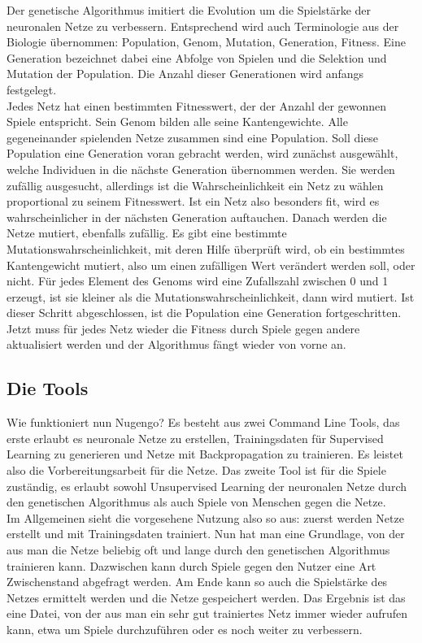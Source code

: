 \documentclass[12pt,a4paper]{article}
\begin{document}
Der genetische Algorithmus imitiert die Evolution um die Spielstärke der neuronalen Netze zu verbessern. Entsprechend wird auch Terminologie aus der Biologie übernommen: Population, Genom, Mutation, Generation, Fitness. Eine Generation bezeichnet dabei eine Abfolge von Spielen und die Selektion und Mutation der Population. Die Anzahl dieser Generationen wird anfangs festgelegt.
\\
Jedes Netz hat einen bestimmten Fitnesswert, der der Anzahl der gewonnen Spiele entspricht. Sein Genom bilden alle seine Kantengewichte. Alle gegeneinander spielenden Netze zusammen sind eine Population. Soll diese Population eine Generation voran gebracht werden, wird zunächst ausgewählt, welche Individuen in die nächste Generation übernommen werden. Sie werden zufällig ausgesucht, allerdings ist die Wahrscheinlichkeit ein Netz zu wählen proportional zu seinem Fitnesswert. Ist ein Netz also besonders fit, wird es wahrscheinlicher in der nächsten Generation auftauchen. Danach werden die Netze mutiert, ebenfalls zufällig. Es gibt eine bestimmte Mutationswahrscheinlichkeit, mit deren Hilfe überprüft wird, ob ein bestimmtes Kantengewicht mutiert, also um einen zufälligen Wert verändert werden soll, oder nicht. Für jedes Element des Genoms wird eine Zufallszahl zwischen 0 und 1 erzeugt, ist sie kleiner als die Mutationswahrscheinlichkeit, dann wird mutiert. Ist dieser Schritt abgeschlossen, ist die Population eine Generation fortgeschritten. Jetzt muss für jedes Netz wieder die Fitness durch Spiele gegen andere aktualisiert werden und der Algorithmus fängt wieder von vorne an.

\subsection{Die Tools}
Wie funktioniert nun Nugengo? Es besteht aus zwei Command Line Tools, das erste erlaubt es neuronale Netze zu erstellen, Trainingsdaten für Supervised Learning zu generieren und Netze mit Backpropagation zu trainieren. Es leistet also die Vorbereitungsarbeit für die Netze. Das zweite Tool ist für die Spiele zuständig, es erlaubt sowohl Unsupervised Learning der neuronalen Netze durch den genetischen Algorithmus als auch Spiele von Menschen gegen die Netze. 
\\
Im Allgemeinen sieht die vorgesehene Nutzung also so aus: zuerst werden Netze erstellt und mit Trainingsdaten trainiert. Nun hat man eine Grundlage, von der aus man die Netze beliebig oft und lange durch den genetischen Algorithmus trainieren kann. Dazwischen kann durch Spiele gegen den Nutzer eine Art Zwischenstand abgefragt werden. Am Ende kann so auch die Spielstärke des Netzes ermittelt werden und die Netze gespeichert werden. Das Ergebnis ist das eine Datei, von der aus man ein sehr gut trainiertes Netz immer wieder aufrufen kann, etwa um Spiele durchzuführen oder es noch weiter zu verbessern.
 
\end{document}
